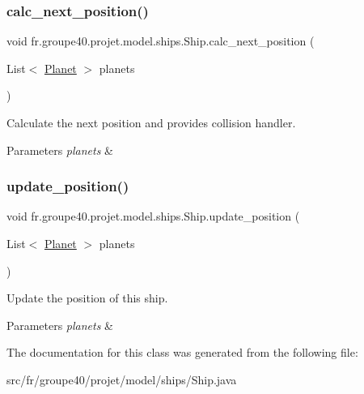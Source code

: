 \subsubsection{\texorpdfstring{calc\+\_\+next\+\_\+position()}{calc\_next\_position()}}
{\footnotesize\ttfamily void fr.\+groupe40.\+projet.\+model.\+ships.\+Ship.\+calc\+\_\+next\+\_\+position (\begin{DoxyParamCaption}\item[{List$<$ \mbox{\hyperlink{classfr_1_1groupe40_1_1projet_1_1model_1_1planets_1_1_planet}{Planet}} $>$}]{planets }\end{DoxyParamCaption})}



Calculate the next position and provides collision handler. 


\begin{DoxyParams}{Parameters}
{\em planets} & \\
\hline
\end{DoxyParams}
\mbox{\label{classfr_1_1groupe40_1_1projet_1_1model_1_1ships_1_1_ship_af4fcf4bf2b5fdad442d33491c69b2019}} 
\subsubsection{\texorpdfstring{update\+\_\+position()}{update\_position()}}
{\footnotesize\ttfamily void fr.\+groupe40.\+projet.\+model.\+ships.\+Ship.\+update\+\_\+position (\begin{DoxyParamCaption}\item[{List$<$ \mbox{\hyperlink{classfr_1_1groupe40_1_1projet_1_1model_1_1planets_1_1_planet}{Planet}} $>$}]{planets }\end{DoxyParamCaption})}



Update the position of this ship. 


\begin{DoxyParams}{Parameters}
{\em planets} & \\
\hline
\end{DoxyParams}


The documentation for this class was generated from the following file\+:\begin{DoxyCompactItemize}
\item 
src/fr/groupe40/projet/model/ships/Ship.\+java\end{DoxyCompactItemize}

